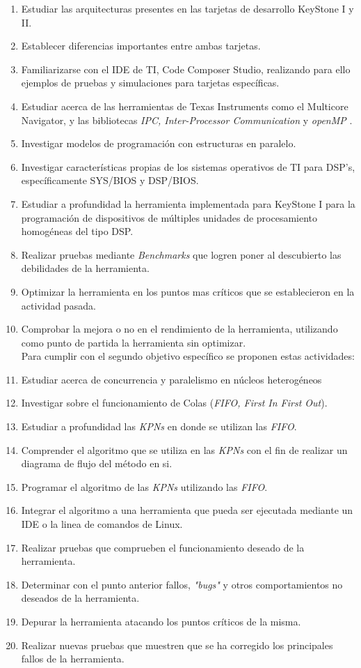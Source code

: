 \begin{enumerate}
 \item Estudiar las arquitecturas presentes en las tarjetas de desarrollo KeyStone I y II.
 \item Establecer diferencias importantes entre ambas tarjetas.
 \item Familiarizarse con el IDE de TI, Code Composer Studio, realizando para ello ejemplos de pruebas
 y simulaciones para tarjetas específicas.
 \item Estudiar acerca de las herramientas de Texas Instruments como el Multicore Navigator, y las
 bibliotecas \textit{IPC, Inter-Processor Communication} y \textit{openMP} .
 \item Investigar modelos de programación con estructuras en paralelo.
 \item Investigar características propias de los sistemas operativos de TI para DSP's, específicamente
 SYS/BIOS y DSP/BIOS.
 \item Estudiar a profundidad la herramienta implementada para KeyStone I para la programación
 de dispositivos de múltiples unidades de procesamiento homogéneas del tipo DSP.
 \item Realizar pruebas mediante \textit{Benchmarks} que logren poner al descubierto las debilidades
 de la herramienta.
 \item Optimizar la herramienta en los puntos mas críticos que se establecieron en la actividad pasada.
 \item Comprobar la mejora o no en el rendimiento de la herramienta, utilizando como punto de partida
 la herramienta sin optimizar.\\
 
 Para cumplir con el segundo objetivo específico se proponen estas actividades: \\
 
 \item Estudiar acerca de concurrencia y paralelismo en núcleos heterogéneos
 \item Investigar sobre el funcionamiento de Colas (\textit{FIFO, First In First Out}).
 \item Estudiar a profundidad las \textit{KPNs} en donde se utilizan las \textit{FIFO}.
 \item Comprender el algoritmo que se utiliza en las \textit{KPNs} con el fin de realizar un diagrama
 de flujo del método en si.
 \item Programar el algoritmo de las \textit{KPNs} utilizando las \textit{FIFO}.
 \item Integrar el algoritmo a una herramienta que pueda ser ejecutada mediante un IDE o la linea de
 comandos de Linux.
 \item Realizar pruebas que comprueben el funcionamiento deseado de la herramienta.
 \item Determinar con el punto anterior fallos, \textit{"bugs"} y otros comportamientos no deseados 
 de la herramienta.
 \item Depurar la herramienta atacando los puntos críticos de la misma.
 \item Realizar nuevas pruebas que muestren que se ha corregido los principales fallos de la herramienta.\\
 

\end{enumerate}
